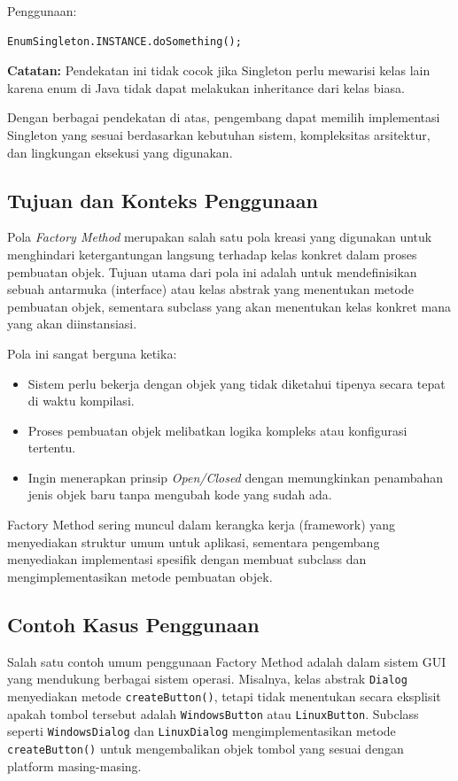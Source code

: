 Penggunaan:
\begin{lstlisting}[style=JavaStyle]
	EnumSingleton.INSTANCE.doSomething();
\end{lstlisting}

\textbf{Catatan:} Pendekatan ini tidak cocok jika Singleton perlu mewarisi kelas lain karena enum di Java tidak dapat melakukan inheritance dari kelas biasa.

\vspace{10pt}
Dengan berbagai pendekatan di atas, pengembang dapat memilih implementasi Singleton yang sesuai berdasarkan kebutuhan sistem, kompleksitas arsitektur, dan lingkungan eksekusi yang digunakan.

\subsection{Tujuan dan Konteks Penggunaan}
Pola \textit{Factory Method} merupakan salah satu pola kreasi yang digunakan untuk menghindari ketergantungan langsung terhadap kelas konkret dalam proses pembuatan objek. Tujuan utama dari pola ini adalah untuk mendefinisikan sebuah antarmuka (interface) atau kelas abstrak yang menentukan metode pembuatan objek, sementara subclass yang akan menentukan kelas konkret mana yang akan diinstansiasi.

Pola ini sangat berguna ketika:
\begin{itemize}
	\item Sistem perlu bekerja dengan objek yang tidak diketahui tipenya secara tepat di waktu kompilasi.
	\item Proses pembuatan objek melibatkan logika kompleks atau konfigurasi tertentu.
	\item Ingin menerapkan prinsip \textit{Open/Closed} dengan memungkinkan penambahan jenis objek baru tanpa mengubah kode yang sudah ada.
\end{itemize}

Factory Method sering muncul dalam kerangka kerja (framework) yang menyediakan struktur umum untuk aplikasi, sementara pengembang menyediakan implementasi spesifik dengan membuat subclass dan mengimplementasikan metode pembuatan objek.

\subsection{Contoh Kasus Penggunaan}
Salah satu contoh umum penggunaan Factory Method adalah dalam sistem GUI yang mendukung berbagai sistem operasi. Misalnya, kelas abstrak \texttt{Dialog} menyediakan metode \texttt{createButton()}, tetapi tidak menentukan secara eksplisit apakah tombol tersebut adalah \texttt{WindowsButton} atau \texttt{LinuxButton}. Subclass seperti \texttt{WindowsDialog} dan \texttt{LinuxDialog} mengimplementasikan metode \texttt{createButton()} untuk mengembalikan objek tombol yang sesuai dengan platform masing-masing.

